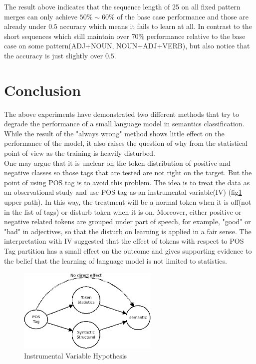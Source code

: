 \documentclass[12pt]{article}
\begin{document}
The result above indicates that the sequence length of 25 on all fixed pattern merges can only achieve $50\%\sim60\%$ of the base case performance and those are already under $0.5$ accuracy which means it fails to learn at all. In contrast to the short sequences which still maintain over $70\%$ performance relative to the base case on some pattern(ADJ+NOUN, NOUN+ADJ+VERB), but also notice that the accuracy is just slightly over $0.5$.


\clearpage
\section{Conclusion}

The above experiments have demonstrated two different methods that try to degrade the performance of a small language model in semantics classification. While the result of the "always wrong" method shows little effect on the performance of the model, it also raises the question of why from the statistical point of view as the training is heavily disturbed. \\

One may argue that it is unclear on the token distribution of positive and negative classes so those tags that are tested are not right on the target. But the point of using POS tag is to avoid this problem. The idea is to treat the data as an observational study and use POS tag as an instrumental variable(IV) (fig\ref{fig:combinIV} upper path). In this way, the treatment will be a normal token when it is off(not in the list of tags) or disturb token when it is on. Moreover, either positive or negative related tokens are grouped under part of speech, for example, "good" or "bad" in adjectives, so that the disturb on learning is applied in a fair sense. The interpretation with IV suggested that the effect of tokens with respect to POS Tag partition has a small effect on the outcome and gives supporting evidence to the belief that the learning of language model is not limited to statistics.
\begin{figure} [!h]
\begin{center}
\includegraphics[width=0.6\textwidth]{figures/combin_IV.png}
\caption{Instrumental Variable Hypothesis}
\label{fig:combinIV}
\end{center}
\end{figure}
\end{document}

